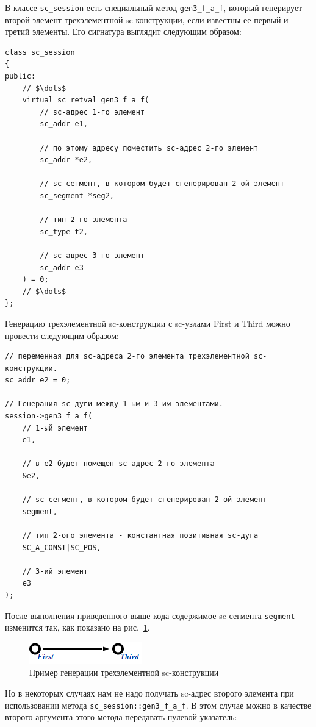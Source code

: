 В классе \lstinline{sc_session} есть специальный метод
\lstinline{gen3_f_a_f}, который генерирует второй элемент
трехэлементной sc-конструкции, если известны ее первый и третий
элементы. Его сигнатура выглядит следующим образом:
\begin{lstlisting}[texcl]
class sc_session
{
public:
    // $\dots$
    virtual sc_retval gen3_f_a_f(
        // sc-адрес 1-го элемент
        sc_addr e1,

        // по этому адресу поместить sc-адрес 2-го элемент
        sc_addr *e2,

        // sc-сегмент, в котором будет сгенерирован 2-ой элемент
        sc_segment *seg2,

        // тип 2-го элемента
        sc_type t2,

        // sc-адрес 3-го элемент
        sc_addr e3
    ) = 0;
    // $\dots$
};
\end{lstlisting}

Генерацию трехэлементной sc-конструкции с sc-узлами First и Third
можно провести следующим образом:
\begin{lstlisting}[texcl]
// переменная для sc-адреса 2-го элемента трехэлементной sc-конструкции.
sc_addr e2 = 0;

// Генерация sc-дуги между 1-ым и 3-им элементами.
session->gen3_f_a_f(
    // 1-ый элемент
    e1,

    // в e2 будет помещен sc-адрес 2-го элемента
    &e2,

    // sc-сегмент, в котором будет сгенерирован 2-ой элемент
    segment,

    // тип 2-ого элемента - константная позитивная sc-дуга
    SC_A_CONST|SC_POS,

    // 3-ий элемент
    e3
);
\end{lstlisting}

После выполнения приведенного выше кода содержимое sc-сегмента
\lstinline|segment| изменится так, как показано на
рис.~\ref{fig:gen3_f_a_f_after}.

\begin{figure}[h!]
  \centering
  \includegraphics{images/4/gen/gen3_f_a_f_after}
  \caption{Пример генерации трехэлементной sc-конструкции}
  \label{fig:gen3_f_a_f_after}
\end{figure}

Но в некоторых случаях нам не надо получать sc-адрес второго элемента
при использовании метода \lstinline|sc_session::gen3_f_a_f|. В этом
случае можно в качестве второго аргумента этого метода передавать
нулевой указатель:

